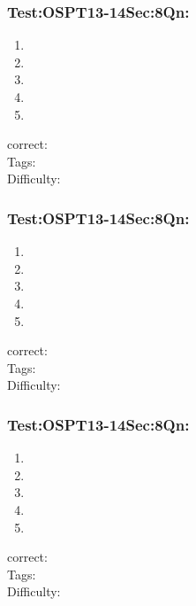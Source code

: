 \documentclass[]{beamer}
\begin{document}
    \begin{frame}
	    \frametitle{Test:OSPT13-14\hspace{2mm}Sec:8\hspace{2mm}Qn:}
	   \begin{enumerate}
	        \item
	           
	        \item
	            
	        \item
	           
	        \item
	            
	        \item
	           
	    \end{enumerate}
	    correct:\\   
	    Tags: \\
	    Difficulty:   \\
    \end{frame}    
    \begin{frame}
	    \frametitle{Test:OSPT13-14\hspace{2mm}Sec:8\hspace{2mm}Qn:}
	   \begin{enumerate}
	        \item
	           
	        \item
	            
	        \item
	           
	        \item
	            
	        \item
	           
	    \end{enumerate}
	    correct:\\   
	    Tags: \\
	    Difficulty:   \\
    \end{frame}    
    \begin{frame}
	    \frametitle{Test:OSPT13-14\hspace{2mm}Sec:8\hspace{2mm}Qn:}
	   \begin{enumerate}
	        \item
	           
	        \item
	            
	        \item
	           
	        \item
	            
	        \item
	           
	    \end{enumerate}
	    correct:\\   
	    Tags: \\
	    Difficulty:   \\
    \end{frame}    
\end{document}

